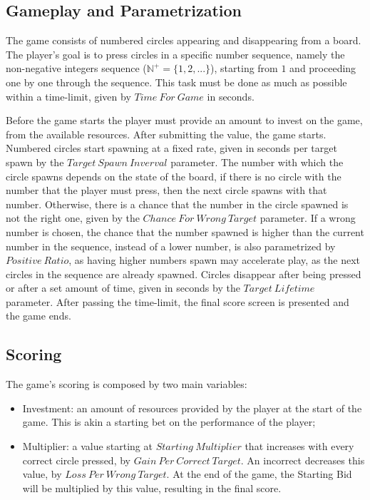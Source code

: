 \subsection{Gameplay and Parametrization} 
The game consists of numbered circles appearing and disappearing from a board. The player's goal is to press circles in a specific number sequence, namely the non-negative integers sequence ($\mathbb{N}^+ = \{1, 2, ...\}$), starting from $1$ and proceeding one by one through the sequence. This task must be done as much as possible within a time-limit, given by $Time\ For\ Game$ in seconds.

Before the game starts the player must provide an amount to invest on the game, from the available resources. After submitting the value, the game starts. Numbered circles start spawning at a fixed rate, given in seconds per target spawn by the $Target\ Spawn\ Inverval$ parameter. The number with which the circle spawns depends on the state of the board, if there is no circle with the number that the player must press, then the next circle spawns with that number. Otherwise, there is a chance that the number in the circle spawned is not the right one, given by the $Chance\ For\ Wrong\ Target$ parameter. If a wrong number is chosen, the chance that the number spawned is higher than the current number in the sequence, instead of a lower number, is also parametrized by $Positive\ Ratio$, as having higher numbers spawn may accelerate play, as the next circles in the sequence are already spawned. Circles disappear after being pressed or after a set amount of time, given in seconds by the $Target\ Lifetime$ parameter. After passing the time-limit, the final score screen is presented and the game ends.


\subsection{Scoring}
\label{subsec:Scoring}
The game's scoring is composed by two main variables:
\begin{itemize}
    \item Investment: an amount of resources provided by the player at the start of the game. This is akin a starting bet on the performance of the player; 
    \item Multiplier: a value starting at $Starting\ Multiplier$ that increases with every correct circle pressed, by $Gain\ Per\ Correct\ Target$. An incorrect decreases this value, by $Loss\ Per\ Wrong\ Target$. At the end of the game, the Starting Bid will be multiplied by this value, resulting in the final score.
\end{itemize}

